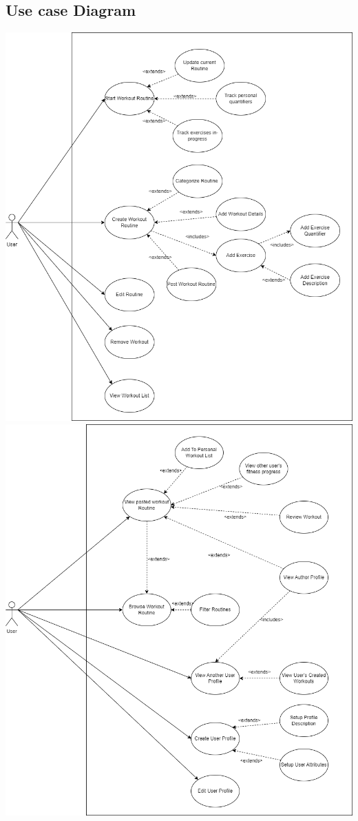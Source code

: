 \documentclass[12pt]{article}
\begin{document}
\subsection{Use case Diagram}
\includegraphics[scale=0.5]{srs_usecase_diagram_routines}
\newpage
\includegraphics[scale=0.5]{srs_usecase_diagram_profiles}
\end{document}
